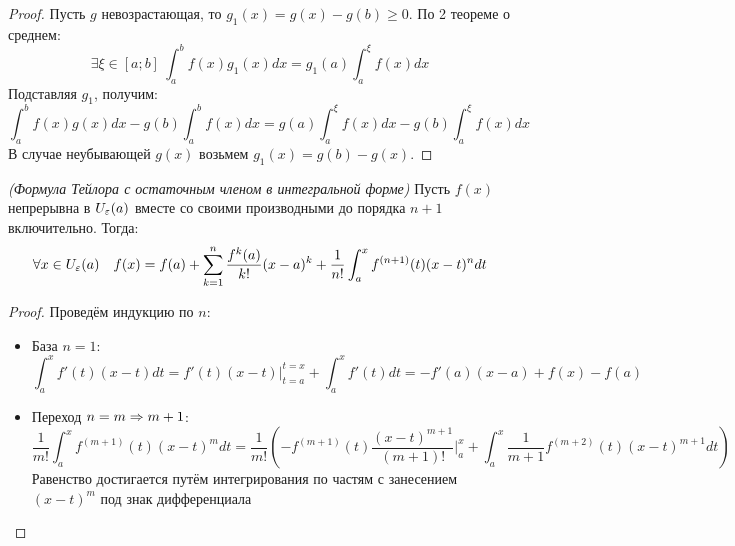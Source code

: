 \begin{proof}
	Пусть $g$  невозрастающая, то $g_1(x) = g(x) - g(b) \geq 0$. По 2 теореме о среднем:
	\[
		\exists \xi \in [a;b]\ \int_a^bf(x)g_1(x)dx = g_1(a)\int_a^\xi f(x)dx
	\]
	Подставляя $g_1$, получим:
	\[
		\int_a^bf(x)g(x)dx - g(b) \int_a^bf(x)dx = g(a)\int_a^\xi f(x)dx - g(b)\int_a^\xi f(x)dx
	\]
	В случае неубывающей $g(x)$ возьмем $g_1(x) = g(b) - g(x)$.
\end{proof}

\begin{theorem} \textit{(Формула Тейлора с остаточным членом в интегральной форме)}
	Пусть $f(x)$ непрерывна в $U_\varepsilon(a)$ вместе со своими производными до порядка $n + 1$ включительно.
	Тогда:
	\[
		\forall x \in U_\varepsilon(a) \quad f(x) = f(a) + \sum\limits_{k = 1}^n\frac{f^k(a)}{k!}(x - a)^k + \frac{1}{n!}\int_a^xf^{(n + 1)}(t)(x - t)^ndt
	\]
\end{theorem}

\begin{proof} Проведём индукцию по $n$:
	\begin{itemize}
		\item База $n = 1$:
		\[
			\int_a^x f'(t)(x - t)dt = f'(t)(x - t) \Bigg |_{t = a}^{t = x} + \int_a^x f'(t)dt = - f'(a)(x - a) + f(x) - f(a)
		\]
		
		\item Переход $n = m \Rightarrow m + 1$:
		\[
			\frac{1}{m!}\int_a^x f^{(m + 1)}(t)(x - t)^m dt = \frac{1}{m!}\left(-f^{(m + 1)}(t)\frac{(x - t)^{m + 1}}{(m + 1)!} \Bigg|_a^x + \int_a^x \frac{1}{m + 1} f^{(m + 2)}(t)(x - t)^{m + 1} dt\right)
		\]
		Равенство достигается путём интегрирования по частям с занесением $(x - t)^m$ под знак дифференциала
	\end{itemize}
\end{proof}